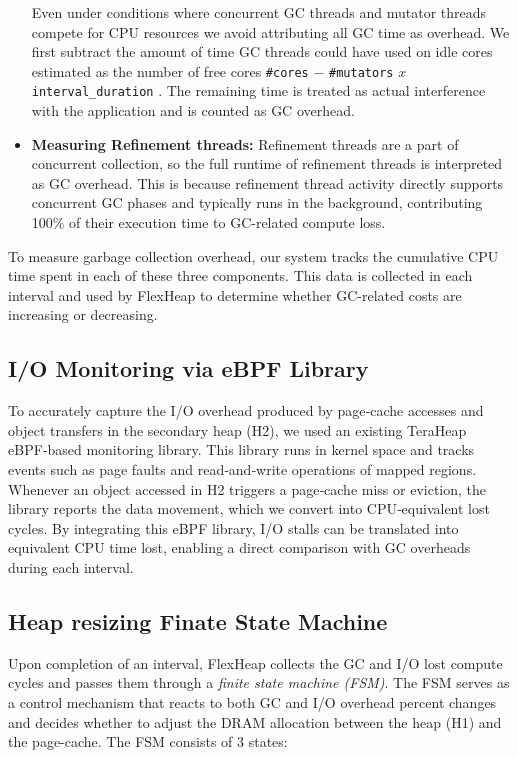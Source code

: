 \begin{itemize}
  Even under conditions where concurrent GC threads and mutator threads compete for CPU resources we avoid attributing all GC time as overhead.
  We first subtract the amount of time GC threads could have used on idle cores estimated 
  as the number of free cores \texttt{\#cores} $-$ \texttt{\#mutators} $x$ \texttt{interval\_duration} .
  The remaining time is treated as actual interference with the
  application and is counted as GC overhead.

  \item \textbf{Measuring Refinement threads:} Refinement threads are a part of concurrent collection, 
  so the full runtime of refinement threads is interpreted as GC overhead. This is because refinement thread 
  activity directly supports concurrent GC phases and typically runs in the background,
  contributing 100\% of their execution time to GC-related compute loss.

\end{itemize}

To measure garbage collection overhead, our system tracks the cumulative CPU time spent in each of these three components. 
This data is collected in each interval and used by FlexHeap to determine whether GC-related costs are increasing or decreasing.

\subsection{I/O Monitoring via eBPF Library}

To accurately capture the I/O overhead produced by page‑cache accesses 
and object transfers in the secondary heap (H2), we used an existing TeraHeap
eBPF‑based monitoring library. This library runs in kernel space and tracks events such as page faults and read‑and‑write
operations of mapped regions. Whenever an object accessed in H2 triggers a page‑cache miss or eviction, the library reports the 
data movement, which we convert into CPU‑equivalent lost cycles. 
By integrating this eBPF library, I/O stalls can be translated into equivalent 
CPU time lost, enabling a direct comparison with GC overheads during each interval.



\subsection{Heap resizing Finate State Machine}

Upon completion of an interval, FlexHeap collects the GC and I/O lost compute cycles and passes them through 
a \textit{finite state machine (FSM)}. The FSM serves as a control mechanism 
that reacts to both GC and I/O overhead percent changes and decides whether to adjust the DRAM allocation 
between the heap (H1) and the page-cache. The FSM consists of 3 states:

